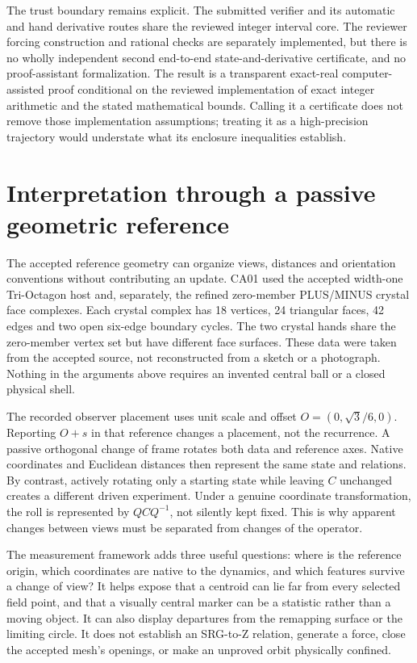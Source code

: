 \documentclass[11pt,a4paper]{article}
\numberwithin{equation}{section}
\begin{document}
The trust boundary remains explicit. The submitted verifier and its automatic and hand derivative routes share the reviewed integer interval core. The reviewer forcing construction and rational checks are separately implemented, but there is no wholly independent second end-to-end state-and-derivative certificate, and no proof-assistant formalization. The result is a transparent exact-real computer-assisted proof conditional on the reviewed implementation of exact integer arithmetic and the stated mathematical bounds. Calling it a certificate does not remove those implementation assumptions; treating it as a high-precision trajectory would understate what its enclosure inequalities establish.

\section{Interpretation through a passive geometric reference}\label{sec:geometry}
The accepted reference geometry can organize views, distances and orientation conventions without contributing an update. CA01 used the accepted width-one Tri-Octagon host and, separately, the refined zero-member PLUS/MINUS crystal face complexes. Each crystal complex has 18 vertices, 24 triangular faces, 42 edges and two open six-edge boundary cycles. The two crystal hands share the zero-member vertex set but have different face surfaces. These data were taken from the accepted source, not reconstructed from a sketch or a photograph. Nothing in the arguments above requires an invented central ball or a closed physical shell.

The recorded observer placement uses unit scale and offset $O=(0,\sqrt3/6,0)$. Reporting $O+s$ in that reference changes a placement, not the recurrence. A passive orthogonal change of frame rotates both data and reference axes. Native coordinates and Euclidean distances then represent the same state and relations. By contrast, actively rotating only a starting state while leaving $C$ unchanged creates a different driven experiment. Under a genuine coordinate transformation, the roll is represented by $QCQ^{-1}$, not silently kept fixed. This is why apparent changes between views must be separated from changes of the operator.

The measurement framework adds three useful questions: where is the reference origin, which coordinates are native to the dynamics, and which features survive a change of view? It helps expose that a centroid can lie far from every selected field point, and that a visually central marker can be a statistic rather than a moving object. It can also display departures from the remapping surface or the limiting circle. It does not establish an SRG-to-Z relation, generate a force, close the accepted mesh's openings, or make an unproved orbit physically confined.
\end{document}
